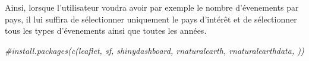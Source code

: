 \documentclass[
]{article}
\newenvironment{Shaded}{\begin{snugshade}}{\end{snugshade}}
\newcommand{\CommentTok}[1]{\textcolor[rgb]{0.56,0.35,0.01}{\textit{#1}}}
\begin{document}
Ainsi, lorsque l'utilisateur voudra avoir par exemple le nombre
d'évenements par pays, il lui suffira de sélectionner uniquement le pays
d'intérêt et de sélectionner tous les types d'évenements ainsi que
toutes les années.

\color{pink}{liste des packages utilisés dans la section R-shiny}

\begin{Shaded}
\begin{Highlighting}[]
\CommentTok{\#install.packages(c(leaflet, sf, shinydashboard, rnaturalearth, rnaturalearthdata, ))}
\end{Highlighting}
\end{Shaded}
\end{document}
